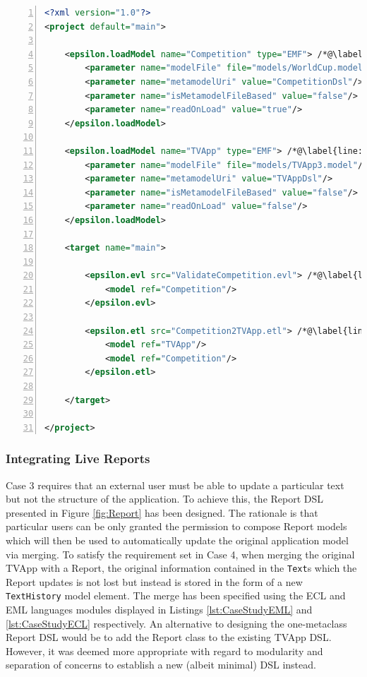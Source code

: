 \begin{lstlisting}[basicstyle=\ttfamily\footnotesize, flexiblecolumns=true, numbers=left, nolol=true, caption=Workflow that integrates the validation and transformation steps, label=lst:TransformCompetitionWorkflow, language=XML, tabsize=2]
<?xml version="1.0"?>
<project default="main">
	
	<epsilon.loadModel name="Competition" type="EMF"> /*@\label{line:LoadCompetitionTask}@*/
		<parameter name="modelFile" file="models/WorldCup.model"/>
		<parameter name="metamodelUri" value="CompetitionDsl"/>
		<parameter name="isMetamodelFileBased" value="false"/>
		<parameter name="readOnLoad" value="true"/>
	</epsilon.loadModel>
	
	<epsilon.loadModel name="TVApp" type="EMF"> /*@\label{line:LoadTVAppTask}@*/
		<parameter name="modelFile" file="models/TVApp3.model"/>
		<parameter name="metamodelUri" value="TVAppDsl"/>
		<parameter name="isMetamodelFileBased" value="false"/>
		<parameter name="readOnLoad" value="false"/>
	</epsilon.loadModel>

	<target name="main">

		<epsilon.evl src="ValidateCompetition.evl"> /*@\label{line:ValidateCompetitionTask}@*/
			<model ref="Competition"/>
		</epsilon.evl>		
		
		<epsilon.etl src="Competition2TVApp.etl"> /*@\label{line:TransformCompetitionTask}@*/
			<model ref="TVApp"/>
			<model ref="Competition"/>
		</epsilon.etl>
		
	</target>
	
</project>
\end{lstlisting}

\subsubsection{Integrating Live Reports}
\label{sec:LiveReports}

Case 3 requires that an external user must be able to update a particular text but not the structure of the application. To achieve this, the Report DSL presented in Figure \ref{fig:Report} has been designed. The rationale is that particular users can be only granted the permission to compose Report models which will then be used to automatically update the original application model via merging. To satisfy the requirement set in Case 4, when merging the original TVApp with a Report, the original information contained in the \texttt{Text}s which the Report updates is not lost but instead is stored in the form of a new \texttt{TextHistory} model element. The merge has been specified using the ECL and EML languages modules displayed in Listings \ref{lst:CaseStudyEML} and \ref{lst:CaseStudyECL} respectively. An alternative to designing the one-metaclass Report DSL would be to add the Report class to the existing TVApp DSL. However, it was deemed more appropriate with regard to modularity and separation of concerns to establish a new (albeit minimal) DSL instead.

